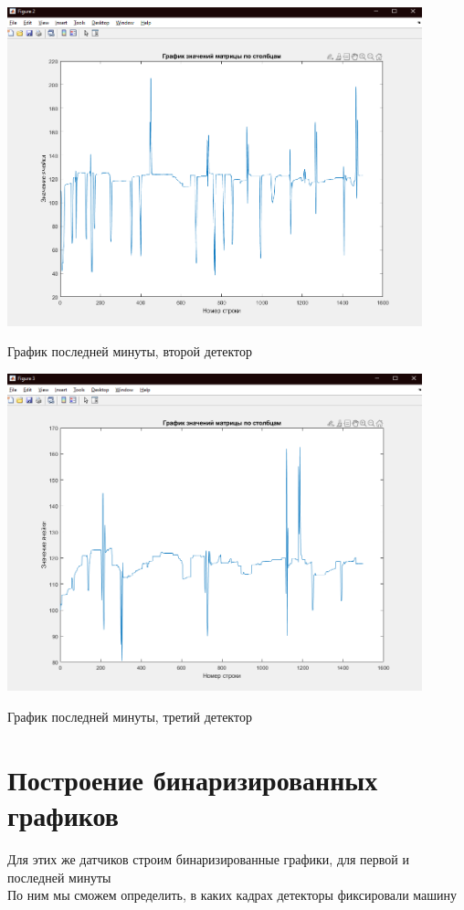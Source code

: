 \documentclass[a4paper,12pt]{article}
\begin{document}
\begin{center}
\includegraphics[width=0.9\textwidth]{images/median/median_color_last_2.png}
\end{center}
\begin{center}
График последней минуты, второй детектор
\end{center}

\begin{center}
\includegraphics[width=0.9\textwidth]{images/median/median_color_last_3.png}
\end{center}
\begin{center}
График последней минуты, третий детектор
\end{center}



\newpage
\section*{Построение бинаризированных графиков}
Для этих же датчиков строим бинаризированные графики, для первой и последней минуты\\
По ним мы сможем определить, в каких кадрах детекторы фиксировали машину
\end{document}
